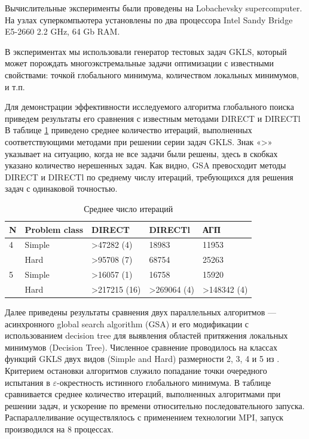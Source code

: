 \documentclass{svproc}
\begin{document}
Вычислительные эксперименты были проведены на Lobachevsky supercomputer. На узлах суперкомпьютера установлены по два процессора Intel Sandy Bridge E5-2660 2.2 GHz, 64 Gb RAM. 

В экспериментах мы использовали генератор тестовых задач GKLS, который может порождать многоэкстремальные задачи оптимизации с известными свойствами: точкой глобального минимума, количеством локальных минимумов, и т.п.

Для демонстрации эффективности исследуемого алгоритма глобального поиска приведем результаты его сравнения с известным методами DIRECT и DIRECTl
В таблице \ref{tab:1} приведено среднее количество итераций, выполненных соответствующими методами при решении серии задач GKLS. Знак «>» указывает на ситуацию, когда не все задачи были решены, здесь в скобках указано количество нерешенных задач. Как видно, GSA превосходит методы DIRECT и DIRECTl по среднему числу итераций, требующихся для решения задач с одинаковой точностью.

\begin{table}[!ht]
    \caption{Среднее число итераций}
    \label{tab:1}
    \centering
    \begin{tabular}{|l|l|l|l|l|}
    \hline
        N & Problem class & DIRECT & DIRECTl & АГП  \\ \hline
        4 & Simple & >47282 (4) & 18983 & 11953  \\ \hline
        ~ & Hard & >95708 (7) & 68754 & 25263  \\ \hline
        5 & Simple & >16057 (1) & 16758 & 15920  \\ \hline
        ~ & Hard & >217215 (16) & >269064 (4) & >148342 (4)  \\ \hline
    \end{tabular}
\end{table}


Далее приведены результаты сравнения двух параллельных алгоритмов --- асинхронного global search algorithm (GSA) и его модификации с использованием decision tree для выявления областей притяжения локальных минимумов (Decision Tree). Численное сравнение проводилось на классах функций GKLS двух видов (Simple and Hard) размерности 2, 3, 4 и 5 из \cite{fio_bib19}. Критерием остановки алгоритмов служило попадание точки очередного испытания в $\varepsilon$-окрестность истинного глобального минимума. 
В таблице сравнивается среднее количество итераций, выполненных алгоритмами при решении задач, и ускорение по времени относительно последовательного запуска. Распараллеливание  осуществлялось с применением технологии MPI, запуск производился на 8 процессах.
\end{document}
